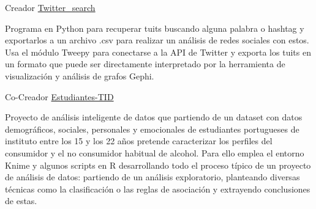 


\begin{cventries}


\cventry
{Creador} %
{\href{https://github.com/AythaE/twitter_search}{Twitter\_search}} %
{} %
{} %
{ %
\begin{cvitems}
\item {Programa en Python para recuperar tuits buscando alguna palabra o hashtag y exportarlos a un archivo .csv para realizar un análisis de redes sociales con estos. Usa el módulo Tweepy para conectarse a la API de Twitter y exporta los tuits en un formato que puede ser directamente interpretado por la herramienta de visualización y análisis de grafos Gephi.}
\end{cvitems}
}



\cventry
{Co-Creador} %
{\href{https://github.com/AythaE/Estudiantes-TID}{Estudiantes-TID}} %
{} %
{} %
{ %
	\begin{cvitems}
		\item {Proyecto de análisis inteligente de datos que partiendo de un dataset con datos demográficos, sociales, personales y emocionales de estudiantes portugueses de instituto entre los 15 y los 22 años pretende caracterizar los perfiles del consumidor y el no consumidor habitual de alcohol. Para ello emplea el entorno Knime y algunos scripts en R desarrollando todo el proceso típico de un proyecto de análisis de datos: partiendo de un análisis exploratorio, planteando diversas técnicas como la clasificación o las reglas de asociación y extrayendo conclusiones de estas.}
	\end{cvitems}
}




\end{cventries}
